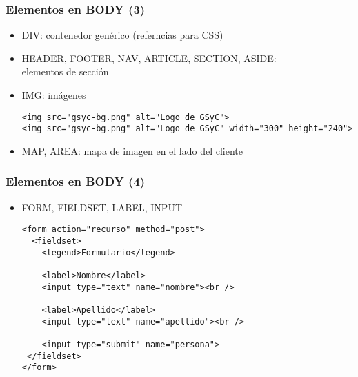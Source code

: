 \begin{frame}[fragile]
\frametitle{Elementos en BODY (3)}

\begin{itemize}
\item DIV: contenedor genérico (referncias para CSS)
\item HEADER, FOOTER, NAV, ARTICLE, SECTION, ASIDE: \\
  elementos de sección
\item IMG: imágenes
\begin{verbatim}
<img src="gsyc-bg.png" alt="Logo de GSyC">
<img src="gsyc-bg.png" alt="Logo de GSyC" width="300" height="240">
\end{verbatim}

\item MAP, AREA: mapa de imagen en el lado del cliente
\end{itemize}

\end{frame}


\begin{frame}[fragile]
\frametitle{Elementos en BODY (4)}

\begin{itemize}
\item FORM, FIELDSET, LABEL, INPUT

\begin{verbatim}
<form action="recurso" method="post">
  <fieldset>
    <legend>Formulario</legend>
 
    <label>Nombre</label>
    <input type="text" name="nombre"><br />
 
    <label>Apellido</label>
    <input type="text" name="apellido"><br />
 
    <input type="submit" name="persona">
 </fieldset>
</form>
\end{verbatim}

\end{itemize}
\end{frame}


